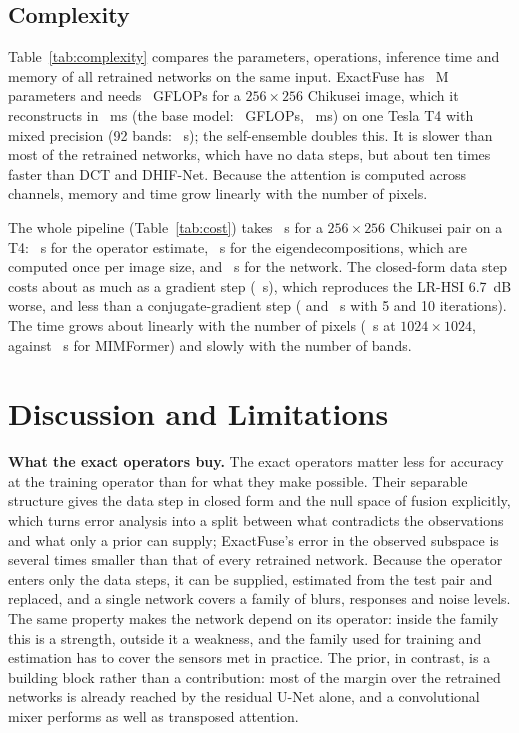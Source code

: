 \documentclass[journal]{IEEEtran}
\begin{document}
\subsection{Complexity}
Table~\ref{tab:complexity} compares the parameters, operations, inference time and memory of all retrained networks on the same input. ExactFuse has ~M parameters and needs ~GFLOPs for a $256\times256$ Chikusei image, which it reconstructs in ~ms (the base model: ~GFLOPs, ~ms) on one Tesla T4 with mixed precision (92 bands: ~s); the self-ensemble doubles this. It is slower than most of the retrained networks, which have no data steps, but about ten times faster than DCT and DHIF-Net. Because the attention is computed across channels, memory and time grow linearly with the number of pixels.


The whole pipeline (Table~\ref{tab:cost}) takes ~s for a $256\times256$ Chikusei pair on a T4: ~s for the operator estimate, ~s for the eigendecompositions, which are computed once per image size, and ~s for the network. The closed-form data step costs about as much as a gradient step (~s), which reproduces the LR-HSI 6.7~dB worse, and less than a conjugate-gradient step ( and ~s with 5 and 10 iterations). The time grows about linearly with the number of pixels (~s at $1024\times1024$, against ~s for MIMFormer) and slowly with the number of bands.


\section{Discussion and Limitations}
\textbf{What the exact operators buy.} The exact operators matter less for accuracy at the training operator than for what they make possible. Their separable structure gives the data step in closed form and the null space of fusion explicitly, which turns error analysis into a split between what contradicts the observations and what only a prior can supply; ExactFuse's error in the observed subspace is several times smaller than that of every retrained network. Because the operator enters only the data steps, it can be supplied, estimated from the test pair and replaced, and a single network covers a family of blurs, responses and noise levels. The same property makes the network depend on its operator: inside the family this is a strength, outside it a weakness, and the family used for training and estimation has to cover the sensors met in practice. The prior, in contrast, is a building block rather than a contribution: most of the margin over the retrained networks is already reached by the residual U-Net alone, and a convolutional mixer performs as well as transposed attention.
\end{document}
